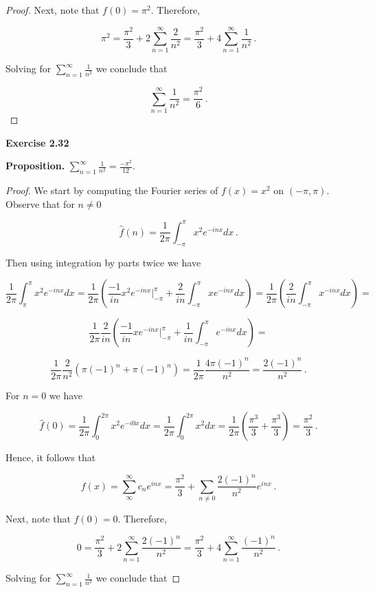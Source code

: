 \documentclass[a4paper]{article}
\numberwithin{equation}{section}
\begin{document}
\begin{description}
\begin{proof}
Next, note that $f(0) = \pi^2$. Therefore,

$$\pi^2 = \frac{\pi^2}{3} + 2\sum_{n=1}^\infty\frac{2}{n^2} = \frac{\pi^2}{3} + 4\sum_{n=1}^\infty\frac{1}{n^2}\,.$$

Solving for $\sum_{n=1}^\infty\frac{1}{n^2}$ we conclude that

$$\sum_{n=1}^\infty\frac{1}{n^2} = \frac{\pi^2}{6}\,.$$

\end{proof}

\item \textbf{Exercise 2.32}

\item \textbf{Proposition.} $\sum_{n=1}^{\infty}\frac{1}{n^2} = \frac{-\pi^2}{12}$.

\item \begin{proof}	We start by computing the Fourier series of $f(x) = x^2$ on $(-\pi,\pi)$. Observe that for $n \neq 0$

$$\hat{f}(n) = \frac{1}{2\pi}\int_{-\pi}^{\pi}x^2e^{-inx}dx\,.$$

Then using integration by parts twice we have

$$\frac{1}{2\pi}\int_\pi^{\pi}x^2e^{-inx}dx = \frac{1}{2\pi}\left(\frac{-1}{in}x^2e^{-inx}\Big|_{-\pi}^\pi + \frac{2}{in}\int_{-\pi}^\pi xe^{-inx}dx\right) = \frac{1}{2\pi}\left(\frac{2}{in}\int_{-\pi}^\pi x^{-inx}dx\right) = $$

$$\frac{1}{2\pi}\frac{2}{in}\left(\frac{-1}{in}xe^{-inx}\Big|_{-\pi}^\pi + \frac{1}{in}\int_{-\pi}^\pi e^{-inx}dx\right) = $$

$$\frac{1}{2\pi}\frac{2}{n^2}\left(\pi(-1)^n + \pi(-1)^n\right) = \frac{1}{2\pi}\frac{4\pi(-1)^n}{n^2} = \frac{2(-1)^n}{n^2}\,.$$

For $n = 0$ we have

$$\hat{f}(0) = \frac{1}{2\pi}\int_0^{2\pi}x^2e^{-i0x}dx = \frac{1}{2\pi}\int_0^{2\pi}x^2dx = \frac{1}{2\pi}\left(\frac{\pi^3}{3} + \frac{\pi^3}{3}\right) = \frac{\pi^2}{3}\,.$$

Hence, it follows that

$$f(x) = \sum_\infty^\infty c_ne^{inx} = \frac{\pi^2}{3} + \sum_{n\neq 0}\frac{2(-1)^n}{n^2}e^{inx}\,.$$

Next, note that $f(0) = 0$. Therefore,

$$0 = \frac{\pi^2}{3} + 2\sum_{n=1}^\infty\frac{2(-1)^n}{n^2} = \frac{\pi^2}{3} + 4\sum_{n=1}^\infty\frac{(-1)^n}{n^2}\,.$$

Solving for $\sum_{n=1}^\infty\frac{1}{n^2}$ we conclude that


\end{proof}
\end{description}
\end{document}
